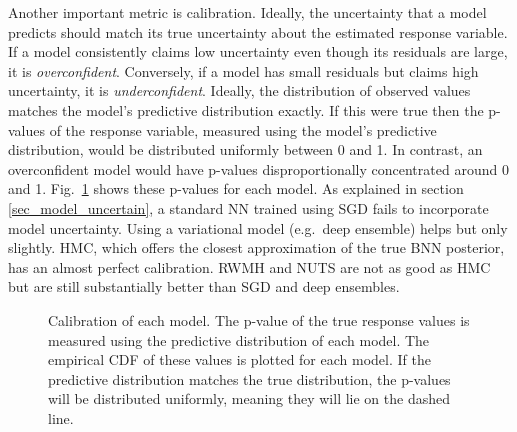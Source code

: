 \documentclass[12pt]{article}
\begin{document}
Another important metric is calibration. Ideally, the uncertainty that a model predicts should match its true uncertainty about the estimated response variable. If a model consistently claims low uncertainty even though its residuals are large, it is \textit{overconfident}. Conversely, if a model has small residuals but claims high uncertainty, it is \textit{underconfident}. Ideally, the distribution of observed values matches the model's predictive distribution exactly. If this were true then the p-values of the response variable, measured using the model's predictive distribution, would be distributed uniformly between 0 and 1. In contrast, an overconfident model would have p-values disproportionally concentrated around 0 and 1. Fig.\ \ref{fig_uci_residuals_pvals} shows these p-values for each model. As explained in section \ref{sec_model_uncertain}, a standard NN trained using SGD fails to incorporate model uncertainty. Using a variational model (e.g.\ deep ensemble) helps but only slightly. HMC, which offers the closest approximation of the true BNN posterior, has an almost perfect calibration. RWMH and NUTS are not as good as HMC but are still substantially better than SGD and deep ensembles.

\begin{figure}[H]
\centering
{}
\caption{Calibration of each model. The p-value of the true response values is measured using the predictive distribution of each model. The empirical CDF of these values is plotted for each model. If the predictive distribution matches the true distribution, the p-values will be distributed uniformly, meaning they will lie on the dashed line.}
\label{fig_uci_residuals_pvals}
\end{figure}
\end{document}
